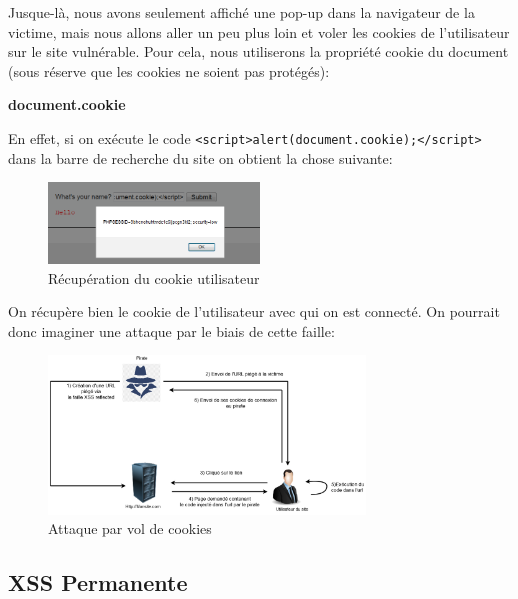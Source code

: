 Jusque-là, nous avons seulement affiché une pop-up dans la navigateur de la victime, mais nous allons aller un peu plus loin et voler les cookies de l’utilisateur sur le site vulnérable. Pour cela, nous utiliserons la propriété cookie du document (sous réserve que les cookies ne soient pas protégés):

\begin{center}
    \textbf{document.cookie}
\end{center}

\noindent En effet, si on exécute le code \lstinline{<script>alert(document.cookie);</script>} dans la barre de recherche du site on obtient la chose suivante:

\begin{figure}[htp!]
  \centering
  \setlength\figureheight{7cm}
  \setlength\figurewidth{9cm}
  \includegraphics[width=0.5\textwidth]{oui/images/xss/xss5.PNG}
  \caption{Récupération du cookie utilisateur}
  \label{fig:courbe-tikz}
\end{figure}

On récupère bien le cookie de l'utilisateur avec qui on est connecté. On pourrait donc imaginer une attaque par le biais de cette faille: 


\begin{figure}[htp!]
  \centering
  \setlength\figureheight{7cm}
  \setlength\figurewidth{9cm}
  \includegraphics[width=0.75\textwidth]{oui/images/xss/Untitled Diagram(3).png}
  \caption{Attaque par vol de cookies}
  \label{fig:courbe-tikz}
\end{figure}

\newpage

\subsection{XSS Permanente}

